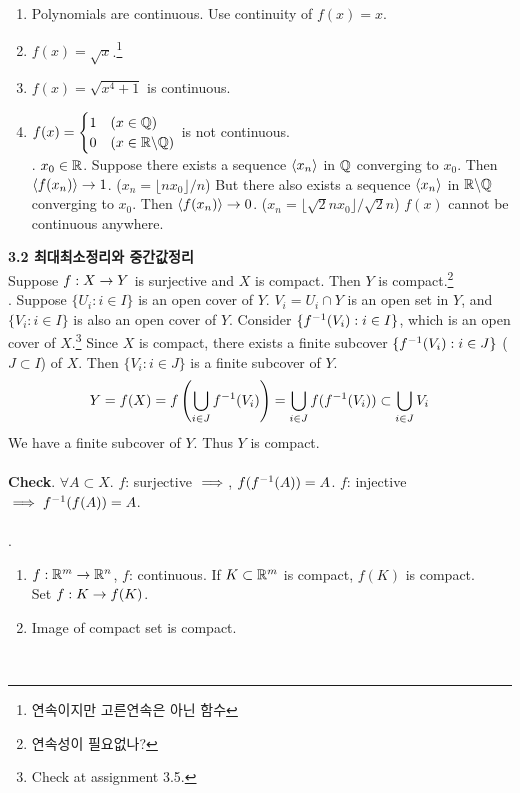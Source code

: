 \begin{enumerate}
	\item Polynomials are continuous. Use continuity of $f(x)=x$.
	\item $f(x) = \sqrt{x}$.\footnote{연속이지만 고른연속은 아닌 함수}
	\item $f(x) = \sqrt{x^4+1}$ is continuous.
	\item $f(x) = \begin{cases}
		1 & (x\in \mathbb{Q})\\
		0 & (x\in \mathbb{R}\backslash\mathbb{Q})
	\end{cases}$ is not continuous.\\
	\pf. $x_0\in \mathbb{R}$. Suppose there exists a sequence $\left\langle x_n \right\rangle$ in $\mathbb{Q}$ converging to $x_0$. Then $\left\langle f(x_n) \right\rangle\rightarrow 1$. ($x_n = \lfloor nx_0 \rfloor / n$) But there also exists a sequence $\left\langle x_n \right\rangle$ in $\mathbb{R}\backslash\mathbb{Q}$ converging to $x_0$. Then $\left\langle f(x_n) \right\rangle \rightarrow 0$. ($x_n = \lfloor \sqrt{2}nx_0\rfloor / \sqrt{2}n$) $f(x)$ cannot be continuous anywhere.
\end{enumerate}
\textbf{3.2 최대최소정리와 중간값정리}\\
 Suppose $f:X\rightarrow Y$ is surjective and $X$ is compact. Then $Y$ is compact.\footnote{연속성이 필요없나?}\\
\pf. Suppose $\{U_i: i\in I\}$ is an open cover of $Y$. $V_i = U_i \cap Y$ is an open set in $Y$, and $\{V_i: i\in I\}$ is also an open cover of $Y$. Consider $\{f^{-1} (V_i):i\in I \}$, which is an open cover of $X$.\footnote{Check at assignment 3.5.} Since $X$ is compact, there exists a finite subcover $\{f^{-1}(V_i): i \in J\}$ ($J\subset I$) of $X$. Then $\{V_i: i\in J\}$ is a finite subcover of $Y$. $$Y = f(X) = f\left(\bigcup_{i\in J} f^{-1}(V_i)\right) = \bigcup_{i\in J} f(f^{-1}(V_i)) \subset \bigcup_{i\in J} V_i$$
We have a finite subcover of $Y$. Thus $Y$ is compact.\\
\\
\textbf{Check}. $\forall A\subset X$. $f$: surjective $\implies $, $f(f^{-1}(A)) = A$. $f$: injective $\implies f^{-1}(f(A)) = A$.\\
\\
\rmk.
\begin{enumerate}
	\item $f: \mathbb{R}^m\rightarrow \mathbb{R}^n$, $f$: continuous. If $K\subset \mathbb{R}^m$ is compact, $f(K)$ is compact.\\
	Set $f: K\rightarrow f(K)$.
	\item Image of compact set is compact.
\end{enumerate}~\\
